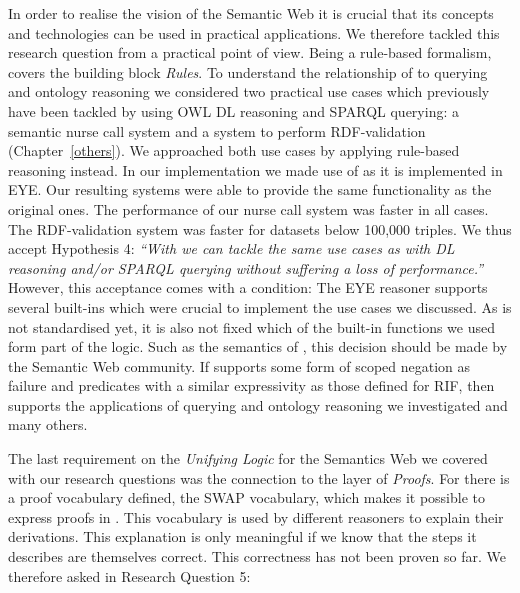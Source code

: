 In order to realise the vision of the Semantic Web it is crucial that its concepts and technologies can be used in practical applications. We therefore 
tackled this research question  from a practical point of view. Being a rule-based formalism, \nthree covers the building block \emph{Rules}.
To understand the relationship of \nthree to querying and ontology reasoning we 
%
% 
considered two practical use cases which previously have been tackled by using OWL DL reasoning and SPARQL querying: a semantic nurse call 
system and a system to perform RDF-validation (Chapter~\ref{others}). %
We approached both use cases by applying rule-based reasoning instead. In our implementation we made use of \nthree %
as it is implemented in EYE.
Our resulting systems were able to provide the same functionality as the original ones.
The performance of our nurse call system was faster in all cases.  
The RDF-validation system was faster for datasets below 100,000 triples. 
We thus accept %
Hypothesis 4:
\emph{
``With \nthreelogic %
we can tackle the same use cases as with \owl DL reasoning and/or SPARQL querying without suffering a loss of performance.''
} However, this acceptance comes with a condition: The EYE reasoner supports several built-ins which were crucial to implement the use cases we discussed. 
As \nthreelogic is not standardised yet, it is also not fixed which of the built-in functions we used form part of the logic. Such as the semantics of \nthree, this decision should be 
made by the Semantic Web community. If \nthree supports some form of scoped negation as failure and predicates with a similar expressivity as those defined for RIF, then \nthree supports 
the
applications of querying and ontology reasoning we investigated and many others.




The last requirement on the \emph{Unifying Logic} for the Semantics Web we covered with our research questions was the connection to the layer of \emph{Proofs}.
For \nthree there is a proof vocabulary defined, the SWAP vocabulary,  which makes it possible to express proofs in \nthree. This vocabulary is used by different reasoners 
to explain their derivations. This explanation is only meaningful if we know that the steps it describes are themselves correct. This correctness has not been proven so far.
We therefore asked in Research Question 5:

